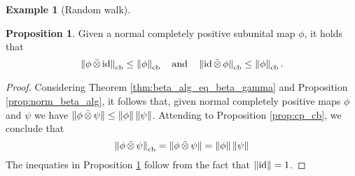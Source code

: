 \documentclass[10pt,a4paper]{amsart}
\theoremstyle{definition}
\theoremstyle{definition}
\newtheorem{example}[definition]{Example}
\theoremstyle{definition}
\theoremstyle{definition}
\newtheorem{proposition}[definition]{Proposition}
\theoremstyle{definition}
\theoremstyle{definition}
\begin{document}
\begin{example}[Random walk]
\begin{comment}
\end{proposition}

\begin{proof}
  Given that the map $\phi \, \bar{\otimes} \, \psi$ is unital  it follows that it is contractive (all subunital maps are contractive), $\ie$, $\norm{\phi \, \bar{\otimes} \, \psi} \leq 1$.
  As a result, by Proposition \ref{prop:cp_cb} we have that $\cbnorm{\phi \, \bar{\otimes} \, \psi} \leq 1$.
  On the other hand attending once more to Proposition \ref{prop:cp_cb}, and the fact that $\phi$ is unital it follows that $\cbnorm{\phi}=\norm{\phi (\id)}  = \norm{\id} = 1$, and $\cbnorm{\psi}=\norm{\psi (\id)}  = \norm{\id} = 1$. Consequently the inequations in Proposition \ref{prop:cb_unital_case} hold.
\end{proof}

\end{comment}


\begin{proposition} \label{prop:cb_tensor_id}
  Given a normal completely positive subunital map  $\phi$, it holds that
  \[
  \left\lVert \phi \,\bar{\otimes} \, \mathrm{id} \right\rVert_{\text{cb}} \leq \left\lVert \phi \right\rVert_{\text{cb}} \quad \text{and} \quad  \left\lVert \mathrm{id}\,\bar{\otimes} \, \phi \right\rVert_{\text{cb}} \leq \left\lVert \phi \right\rVert_{\text{cb}} .
\]
\end{proposition}

\begin{proof}
Considering Theorem \ref{thm:beta_alg_eq_beta_gamma} and Proposition
\ref{prop:norm_beta_alg}, it follows that, given normal completely positive maps $\phi$ and $\psi$ we have $\left\lVert \phi \,\bar{\otimes} \, \psi \right\rVert \leq \left\lVert \phi \right\rVert \left\lVert \psi \right\rVert$. Attending to Proposition \ref{prop:cp_cb}, we conclude that 
$$\left\lVert \phi \,\bar{\otimes} \, \psi \right\rVert_{\text{cb}} = \left\lVert \phi \,\bar{\otimes} \, \psi \right\rVert =  \left\lVert \phi \right\rVert \left\lVert \psi \right\rVert $$
The inequaties in Proposition \ref{prop:cb_tensor_id} follow from the fact that $\left\lVert \mathrm{id} \right\rVert=1$.
\end{proof}



\begin{comment}

\begin{proposition}
  The category $\WstarCPSUop$ is $\catMet$-enriched and the bifunctor $\bar{\otimes} :  \WstarCPSUop \otimes \WstarCPSUop\to \WstarCPSUop$ is $\mathsf{Met}$-enriched as well.
\end{proposition}



\end{comment}
\end{example}
\end{document}
